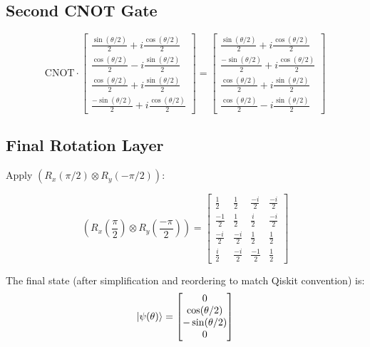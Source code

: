 \documentclass[
	a4paper,
	12pt,
	oneside,
]{article}
\begin{document}
\subsection{Second CNOT Gate}

\[
\text{CNOT} \cdot \begin{bmatrix}
	\frac{\sin(\theta/2)}{2} + i\frac{\cos(\theta/2)}{2} \\
	\frac{\cos(\theta/2)}{2} - i\frac{\sin(\theta/2)}{2} \\
	\frac{\cos(\theta/2)}{2} + i\frac{\sin(\theta/2)}{2} \\
	\frac{-\sin(\theta/2)}{2} + i\frac{\cos(\theta/2)}{2}
\end{bmatrix} = \begin{bmatrix}
	\frac{\sin(\theta/2)}{2} + i\frac{\cos(\theta/2)}{2} \\
	\frac{-\sin(\theta/2)}{2} + i\frac{\cos(\theta/2)}{2} \\
	\frac{\cos(\theta/2)}{2} + i\frac{\sin(\theta/2)}{2} \\
	\frac{\cos(\theta/2)}{2} - i\frac{\sin(\theta/2)}{2}
\end{bmatrix}
\]

\subsection{Final Rotation Layer}

Apply $(R_x(\pi/2) \otimes R_y(-\pi/2))$:

\[
(R_x(\frac{\pi}{2}) \otimes R_y(\frac{-\pi}{2})) = \begin{bmatrix}
	\frac{1}{2} & \frac{1}{2} & \frac{-i}{2} & \frac{-i}{2} \\
	\frac{-1}{2} & \frac{1}{2} & \frac{i}{2} & \frac{-i}{2} \\
	\frac{-i}{2} & \frac{-i}{2} & \frac{1}{2} & \frac{1}{2} \\
	\frac{i}{2} & \frac{-i}{2} & \frac{-1}{2} & \frac{1}{2}
\end{bmatrix}
\]

The final state (after simplification and reordering to match Qiskit convention) is:
\begin{equation}
\ket{\psi(\theta)} = \begin{bmatrix}
	0 \\
	\cos(\theta/2) \\
	-\sin(\theta/2) \\
	0
\end{bmatrix}
\label{eq:ansatz-state}
\end{equation}
\end{document}
